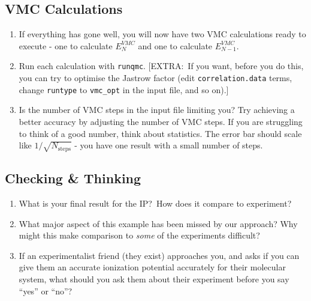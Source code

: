 \documentclass[12pt, a4paper]{article}
\begin{document}
\subsection{VMC Calculations}\label{sub:vmc_calculations}

\begin{enumerate}

  \item If everything has gone well, you will now have two VMC calculations
  ready to execute - one to calculate $E^{VMC}_{N}$ and one to calculate
  $E^{VMC}_{N-1}$.

  \item Run each calculation with \texttt{runqmc}. [EXTRA:\ If you want, before
  you do this, you can try to optimise the Jastrow factor (edit
  \texttt{correlation.data} terms, change \texttt{runtype} to \texttt{vmc\_opt}
  in the input file, and so on).]

  \item Is the number of VMC steps in the input file limiting you? Try
  achieving a better accuracy by adjusting the number of VMC steps. If you are
  struggling to think of a good number, think about statistics. The error bar
  should scale like $1/\sqrt{N_{\text{steps}}}$ - you have one result with a
  small number of steps.

\end{enumerate}

\subsection{Checking \& Thinking}\label{sub:checking_&_thinking}

\begin{enumerate}

  \item What is your final result for the IP?\ How does it compare to
  experiment?

  \item What major aspect of this example has been missed by our approach? Why
  might this make comparison to \textit{some} of the experiments difficult?

  \item If an experimentalist friend (they exist) approaches you, and asks if
  you can give them an accurate ionization potential accurately for their
  molecular system, what should you ask them about their experiment before you
  say ``yes'' or ``no''?

\end{enumerate}
\end{document}
